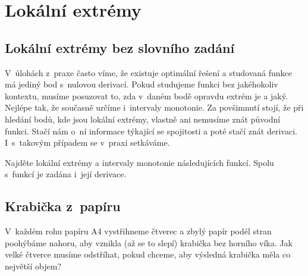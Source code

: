 \konec

\stranka
\section{Lokální extrémy}

\stranka
\subsection{Lokální extrémy bez slovního zadání} V úlohách z praxe často
víme, že existuje optimální řešení a studovaná funkce má jediný bod s nulovou derivací. Pokud studujeme funkci bez jakéhokoliv kontextu,
musíme posuzovat to, zda v daném bodě opravdu extrém je a
jaký. Nejlépe tak, že současně určíme i intervaly monotonie. Za
povšimnutí stojí, že při hledání bodů, kde jsou lokální extrémy,
vlastně ani nemusíme znát původní funkci. Stačí nám o ní informace
týkající se spojitosti a poté stačí znát derivaci. I~s~takovým
případem se v praxi setkáváme.


Najděte lokální extrémy a intervaly monotonie následujících funkcí. Spolu s funkcí je zadána i její derivace.



\subsection{Krabička z papíru}  V každém rohu papíru A4 vystřihneme
čtverec a zbylý papír podél stran poohýbáme nahoru, aby vznikla (až se
to slepí) krabička bez horního víka. Jak velké čtverce musíme
odstříhat, pokud chceme, aby výsledná
krabička měla co největší objem?


